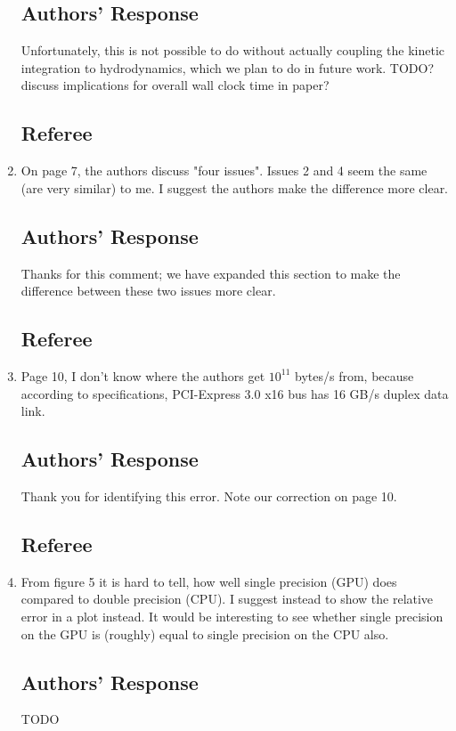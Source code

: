 \documentclass[12pt]{article}
\begin{document}
\begin{enumerate}
\subsection*{Authors' Response}
Unfortunately, this is not possible to do without actually coupling the kinetic integration to hydrodynamics, which we plan to do in future work.  TODO? discuss implications for overall wall clock time in paper?

\subsection*{Referee}
\item On page 7, the authors discuss "four issues". Issues 2 and 4 seem the same (are very similar) to me. I suggest the authors make the difference more clear.

\subsection*{Authors' Response}
Thanks for this comment; we have expanded this section to make the difference between these two issues more clear.

\subsection*{Referee}
\item Page 10, I don't know where the authors get $10^{11}$ bytes/s from, because according to specifications, PCI-Express 3.0 x16 bus has 16 GB/s duplex data link.

\subsection*{Authors' Response}
Thank you for identifying this error.  Note our correction on page 10.

\subsection*{Referee}
\item From figure 5 it is hard to tell, how well single precision (GPU) does compared to double precision (CPU). I suggest instead to show the relative error in a plot instead. It would be interesting to see whether single precision on the GPU is (roughly) equal to single precision on the CPU also.

\subsection*{Authors' Response}
TODO


\end{enumerate}
\end{document}
